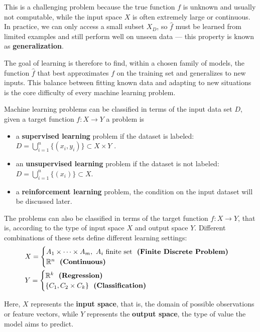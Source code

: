 \documentclass[10pt, letterpaper]{report}
\begin{document}
This is a challenging problem because the true function $f$ is unknown and usually not computable, while the input space $X$ is often extremely large or continuous.
In practice, we can only access a small subset $X_D$, so $\hat f$ must be learned from limited examples and still perform well on unseen data — this property is known as \textbf{generalization}.\bigskip

The goal of learning is therefore to find, within a chosen family of models, the function $\hat f$ that best approximates $f$ on the training set and generalizes to new inputs.
This balance between fitting known data and adapting to new situations is the core difficulty of every machine learning problem.\bigskip

Machine learning problems can be classified in terms of the input data set $D$, given a target function $f:X\rightarrow Y$ a problem is\begin{itemize}
	\item a \textbf{supervised learning} problem if the dataset is labeled: $D=\bigcup_{i=1}^n\{(x_i,y_i)\}\subset X\times Y$ .
	\item an \textbf{unsupervised learning} problem if the dataset is not labeled: $D=\bigcup_{i=1}^n\{(x_i)\}\subset X$.
	\item a \textbf{reinforcement learning} problem, the condition on the input dataset will be discussed later.
\end{itemize}

The problems can also be classified in terms of the target function $f : X \rightarrow Y$, that is, according to the type of input space $X$ and output space $Y$.
Different combinations of these sets define different learning settings:
\begin{align*}
	 & X=\begin{cases}
		     A_1\times \dots \times A_m, \ A_i \text{ finite set} \ \ \textbf{(Finite Discrete Problem)} \\
		     \R^n \ \ \textbf{(Continuous)}
	     \end{cases} \\
	 & Y=\begin{cases}
		     \R^k \ \ \textbf{(Regression)} \\
		     \{C_1,C_2\times C_k\} \ \ \textbf{(Classification)}
	     \end{cases}
\end{align*}

Here, $X$ represents the \textbf{input space}, that is, the domain of possible observations or feature vectors, while $Y$ represents the \textbf{output space}, the type of value the model aims to predict.
\end{document}
